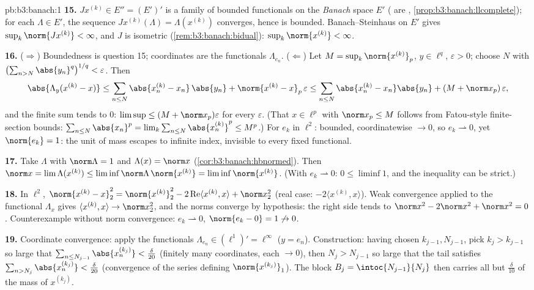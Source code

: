 \begin{solution}{pb:b3:banach:1}
\textbf{15.} $J x^{(k)} \in E'' = (E')'$ is a family of
bounded functionals on the \emph{Banach} space $E'$ (
are , \cref{prop:b3:banach:llcomplete}); for each
$\Lambda \in E'$, the sequence $Jx^{(k)}(\Lambda) =
\Lambda(x^{(k)})$ converges, hence is bounded.
Banach--Steinhaus on $E'$ gives $\sup_k\norm{Jx^{(k)}} <
\infty$, and $J$ is isometric
(\cref{rem:b3:banach:bidual}): $\sup_k\norm{x^{(k)}} <
\infty$.

\textbf{16.} ($\Rightarrow$) Boundedness is question 15;
coordinates are the functionals $\Lambda_{e_n}$.
($\Leftarrow$) Let $M = \sup_k\norm{x^{(k)}}_p$, $y \in
\ell^q$, $\varepsilon > 0$; choose $N$ with
$\bigl(\sum_{n>N}\abs{y_n}^q\bigr)^{1/q} < \varepsilon$. Then
\[
\abs{\Lambda_y(x^{(k)} - x)} \leq
\sum_{n\leq N}\abs{x^{(k)}_n - x_n}\,\abs{y_n} +
\norm{x^{(k)} - x}_p\,\varepsilon
\leq \sum_{n\leq N}\abs{x^{(k)}_n - x_n}\abs{y_n} +
(M + \norm x_p)\,\varepsilon,
\]
and the finite sum tends to $0$: $\limsup \leq (M + \norm
x_p)\varepsilon$ for every $\varepsilon$. (That $x \in
\ell^p$ with $\norm x_p \leq M$ follows from Fatou-style
finite-section bounds: $\sum_{n \leq N}\abs{x_n}^p =
\lim_k\sum_{n\leq N}\abs{x^{(k)}_n}^p \leq M^p$.) For $e_k$
in $\ell^2$: bounded, coordinatewise $\to 0$, so $e_k
\rightharpoonup 0$, yet $\norm{e_k} = 1$: the unit of mass
escapes to infinite index, invisible to every fixed
functional.

\textbf{17.} Take $\Lambda$ with $\norm\Lambda = 1$ and
$\Lambda(x) = \norm x$ (\cref{cor:b3:banach:hbnormed}). Then
$\norm x = \lim\Lambda(x^{(k)}) \leq
\liminf\norm\Lambda\,\norm{x^{(k)}} =
\liminf\norm{x^{(k)}}$. (With $e_k \rightharpoonup 0$: $0
\leq \liminf 1$, and the inequality can be strict.)

\textbf{18.} In $\ell^2$, $\norm{x^{(k)} - x}_2^2 =
\norm{x^{(k)}}_2^2 - 2\operatorname{Re}\langle x^{(k)},
x\rangle + \norm x_2^2$ (real case: $-2\langle x^{(k)},
x\rangle$). Weak convergence applied to the functional
$\Lambda_x$ gives $\langle x^{(k)}, x\rangle \to \norm
x_2^2$, and the norms converge by hypothesis: the right side
tends to $\norm x^2 - 2\norm x^2 + \norm x^2 = 0$.
Counterexample without norm convergence: $e_k
\rightharpoonup 0$, $\norm{e_k - 0} = 1 \not\to 0$.

\textbf{19.} Coordinate convergence: apply the functionals
$\Lambda_{e_n} \in (\ell^1)' = \ell^\infty$ ($y = e_n$).
Construction: having chosen $k_{j-1}, N_{j-1}$, pick $k_j >
k_{j-1}$ so large that $\sum_{n \leq
N_{j-1}}\abs{x^{(k_j)}_n} < \frac\delta{20}$ (finitely many
coordinates, each $\to 0$), then $N_j > N_{j-1}$ so large
that the tail satisfies $\sum_{n > N_j}\abs{x^{(k_j)}_n} <
\frac\delta{20}$ (convergence of the series defining
$\norm{x^{(k_j)}}_1$). The block $B_j = \intoc{N_{j-1}}{N_j}$
then carries all but $\frac\delta{10}$ of the mass of
$x^{(k_j)}$.


\end{solution}
